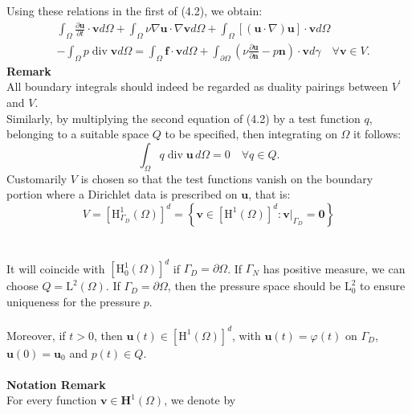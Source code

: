 \documentclass[11pt]{book}
\begin{document}
Using these relations in the first of (4.2), we obtain:
\begin{equation}
\begin{aligned}
& \int_{\Omega} \frac{\partial \mathbf{u}}{\partial t} \cdot \mathbf{v} d \Omega+\int_{\Omega} \nu \nabla \mathbf{u} \cdot \nabla \mathbf{v} d \Omega+\int_{\Omega}[(\mathbf{u} \cdot \nabla) \mathbf{u}] \cdot \mathbf{v} d \Omega \\
& -\int_{\Omega} p \operatorname{div} \mathbf{v} d \Omega=\int_{\Omega} \mathbf{f} \cdot \mathbf{v} d \Omega+\int_{\partial \Omega}\left(\nu \frac{\partial \mathbf{u}}{\partial \mathbf{n}}-p \mathbf{n}\right) \cdot \mathbf{v} d \gamma \quad \forall \mathbf{v} \in V .
\end{aligned}
\end{equation}
\textbf{Remark} \\
All boundary integrals should indeed be regarded as duality pairings between $V^{\prime}$ and $V$. \\
Similarly, by multiplying the second equation of (4.2) by a test function $q$, belonging to a suitable space $Q$ to be specified, then integrating on $\Omega$ it follows:
\begin{equation}
\int_{\Omega} q \operatorname{div} \mathbf{u} \, d \Omega = 0 \quad \forall q \in Q .
\end{equation}
Customarily $V$ is chosen so that the test functions vanish on the boundary portion where a Dirichlet data is prescribed on $\mathbf{u}$, that is:
\begin{equation}
V=\left[\mathrm{H}_{\Gamma_{D}}^{1}(\Omega)\right]^{d}=\left\{\mathbf{v} \in\left[\mathrm{H}^{1}(\Omega)\right]^{d}:\left.\mathbf{v}\right|_{\Gamma_{D}}=\mathbf{0}\right\}
\end{equation}\\ \\
It will coincide with $\left[\mathrm{H}_{0}^{1}(\Omega)\right]^{d}$ if $\Gamma_{D}=\partial \Omega$. If $\Gamma_{N}$ has positive measure, we can choose $Q=\mathrm{L}^{2}(\Omega)$. If $\Gamma_{D}=\partial \Omega$, then the pressure space should be $\mathrm{L}_{0}^{2}$ to ensure uniqueness for the pressure $p$.\\ \\
Moreover, if $t>0$, then $\mathbf{u}(t) \in\left[\mathrm{H}^{1}(\Omega)\right]^{d}$, with $\mathbf{u}(t)=\varphi(t)$ on $\Gamma_{D}$, $\mathbf{u}(0)=\mathbf{u}_{0}$ and $p(t) \in Q$.\\ \\
\textbf{Notation Remark} \\
For every function $\mathbf{v} \in \mathbf{H}^{1}(\Omega)$, we denote by
\end{document}
